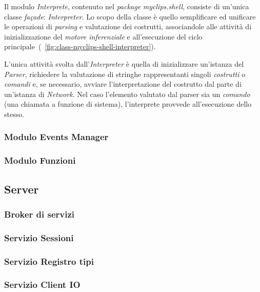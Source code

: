Il modulo \emph{Interprete}, contenuto nel \emph{package} \emph{myclips.shell}, consiste di un'unica classe \emph{fa\c{c}ade}: \emph{Interpreter}. Lo scopo della classe è quello semplificare ed unificare le operazioni di \emph{parsing} e valutazione dei costrutti, associandole alle attività di inizializzazione del \emph{motore inferenziale} e all'esecuzione del ciclo principale~(\figurename~\ref{fig:class-myclips-shell-interpreter}).

L'unica attività svolta dall'\emph{Interpreter} è quella di inizializzare un'istanza del \emph{Parser}, richiedere la valutazione di stringhe rappresentanti singoli \emph{costrutti} o \emph{comandi} e, se necessario, avviare l'interpretazione del costrutto dal parte di un'istanza di \emph{Network}. Nel caso l'elemento valutato dal parser sia un \emph{comando} (una chiamata a funzione di sistema), l'interprete provvede all'esecuzione dello stesso.

\subsubsection{Modulo Events Manager}

\subsubsection{Modulo Funzioni}

\subsection{Server}

\subsubsection{Broker di servizi}

\subsubsection{Servizio Sessioni}

\subsubsection{Servizio Registro tipi}

\subsubsection{Servizio Client IO}

